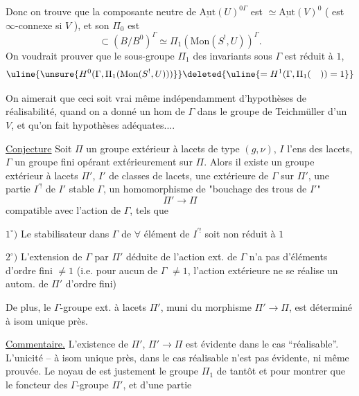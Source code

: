 Donc on trouve que la composante neutre de
$\underline{\mathrm{Aut}}(U)^{0\Gamma}$ est $\simeq\underline{\mathrm{Aut}}(V)^0$
( est $\infty$-connexe si $V$ ), et son $\Pi_0$ est
\[
\subset(B/B^0)^\Gamma\simeq\Pi_1(\mathrm{Mon}(S^!,U))^\Gamma.
\]
On voudrait prouver que le sous-groupe   $\Pi_1$ des
invariants sous $\Gamma$ est réduit à $1$,
\[
\uline{\unsure{H^0(\Gamma,\Pi_1(\mathrm{Mon}(S^!,U)))}}
\deleted{\uline{=H^1(\Gamma,\Pi_1(\quad))=1}}
\]

On aimerait que ceci soit vrai même indépendamment d'hypothèses de réalisabilité,
quand on a donné un hom de $\Gamma$ dans le groupe de Teichmüller d'un $V$,
et qu'on fait  hypothèses adéquates....

\uline{Conjecture} Soit $\Pi$ un groupe extérieur à lacets de type $(g,\nu)$,
$I$ l'ens  des  lacets,
$\Gamma$ un groupe fini opérant extérieurement sur $\Pi$.
Alors il existe un groupe extérieur à lacets $\Pi'$,  $I'$ de classes
de lacets, une  extérieure de $\Gamma$ sur $\Pi'$, une partie
$I^{\prime!}$ de $I'$ stable  $\Gamma$, un homomorphisme 
de "bouchage des trous de $I'$"
\[
\Pi'\longrightarrow\Pi
\]
compatible avec l'action de $\Gamma$, tels que

$1^\circ)$ Le stabilisateur dans $\Gamma$ de $\forall$ élément de $I^{\prime!}$ soit non réduit à $1$

$2^\circ)$ L'extension de $\Gamma$ par $\Pi'$ déduite de l'action ext. de $\Gamma$ n'a pas d'éléments d'ordre fini $\ne 1$ (i.e. pour aucun  de $\Gamma$ $\ne 1$, l'action extérieure  ne se réalise  un autom. de $\Pi'$ d'ordre fini)

De plus, le $\Gamma$-groupe ext. à lacets $\Pi'$, muni du morphisme $\Pi'\longrightarrow\Pi$, est déterminé à isom unique près.

 \uline{Commentaire.} L'existence de $\Pi'$,  $\Pi'\longrightarrow\Pi$ est évidente dans le cas ``réalisable''. L'unicité -- à isom unique près,  dans le cas réalisable n'est pas évidente, ni même prouvée. Le noyau de 
est justement le groupe $\Pi_1$ de tantôt
et pour montrer que le foncteur des   $\Gamma$-groupe  $\Pi'$,  et d'une partie


